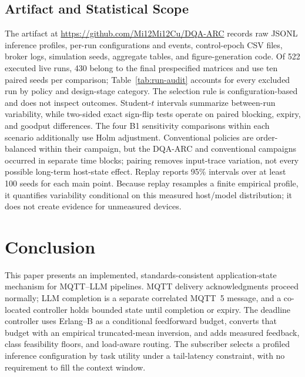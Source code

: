 \documentclass[journal]{IEEEtran}
\newcommand{\method}{DQA-ARC}
\newcommand{\artifacturl}{\url{https://github.com/Mi12Mi12Cu/DQA-ARC}}
\begin{document}
\subsection{Artifact and Statistical Scope}

The artifact at \artifacturl{} records raw JSONL inference profiles, per-run configurations and events, control-epoch CSV files, broker logs, simulation seeds, aggregate tables, and figure-generation code. Of 522 executed live runs, 430 belong to the final prespecified matrices and use ten paired seeds per comparison; Table~\ref{tab:run-audit} accounts for every excluded run by policy and design-stage category. The selection rule is configuration-based and does not inspect outcomes. Student-$t$ intervals summarize between-run variability, while two-sided exact sign-flip tests operate on paired blocking, expiry, and goodput differences. The four B1 sensitivity comparisons within each scenario additionally use Holm adjustment. Conventional policies are order-balanced within their campaign, but the \method{} and conventional campaigns occurred in separate time blocks; pairing removes input-trace variation, not every possible long-term host-state effect. Replay reports 95\% intervals over at least 100 seeds for each main point. Because replay resamples a finite empirical profile, it quantifies variability conditional on this measured host/model distribution; it does not create evidence for unmeasured devices.

\section{Conclusion}
\label{sec:conclusion}

This paper presents an implemented, standards-consistent application-state mechanism for MQTT--LLM pipelines. MQTT delivery acknowledgments proceed normally; LLM completion is a separate correlated MQTT~5 message, and a co-located controller holds bounded state until completion or expiry. The deadline controller uses Erlang--B as a conditional feedforward budget, converts that budget with an empirical truncated-mean inversion, and adds measured feedback, class feasibility floors, and load-aware routing. The subscriber selects a profiled inference configuration by task utility under a tail-latency constraint, with no requirement to fill the context window.
\end{document}
